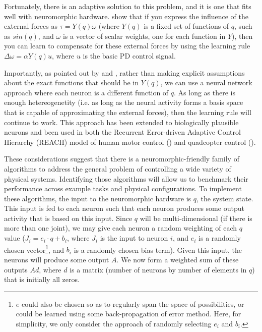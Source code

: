 \documentclass{frontiersSCNS} %
\begin{document}
Fortunately, there is an adaptive solution to this problem, and it is one that
fits well with neuromorphic hardware.  \cite{Slotine1987} show that if you
express the influence of the external forces as $\tau=Y(q) \omega$
(where $Y(q)$ is a fixed set of functions of $q$, such as $sin(q)$, and $\omega$
is a vector of scalar weights, one for each function in $Y$), then you can learn
to compensate for these external forces by using the learning rule $\Delta \omega = \alpha Y(q) u$,
where $u$ is the basic PD control signal.

Importantly, as pointed out by \cite{SannerSlotine1992} and \cite{Lewis1996}, rather than making explicit
assumptions about the exact functions that should be in $Y(q)$, we can use
a neural network approach where each neuron is a different function of $q$.  
As long as there is enough hetereogenetity (i.e. as long as the neural activity
forms a basis space that is capable of approximating the external forces), then the
learning rule will continue to work.  This approach has been extended to
biologically plausible neurons and been used in both the
Recurrent Error-driven Adaptive Control Hierarchy (REACH) model of human motor control
(\citealt{dewolf2014}) and quadcopter control (\citealt{KomerThesis}).

These considerations suggest that there is a neuromorphic-friendly family of 
algorithms to address the general problem of controlling a wide variety of 
physical systems.  Identifying those algorithms will allow us to benchmark 
their performance across example tasks and physical configurations.  
To implement these algorithms, the input to the
neuromorphic hardware is $q$, the system state.  This input is fed to each
neuron such that each neuron produces some output activity that is based on
this input.  Since $q$ will be multi-dimensional (if there is more than one
joint), we may give each neuron a random weighting of each $q$ value ($J_i=e_i \cdot q + b_i$, 
where $J_i$ is the input to neuron $i$, and $e_i$ is a randomly chosen 
vector\footnote{$e$ could also be chosen so as to regularly span the space of possibilities,
or could be learned using some back-propagation of error method.  Here, for simplicity, we only
consider the approach of randomly selecting $e_i$ and $b_i$.},
and $b_i$ is a randomly chosen bias term).  
Given this input, the neurons will produce some output $A$.
We now form a weighted sum of these outputs $Ad$, where $d$ is a matrix (number of neurons by number of elements in $q$)
that is initially all zeros.
\end{document}
